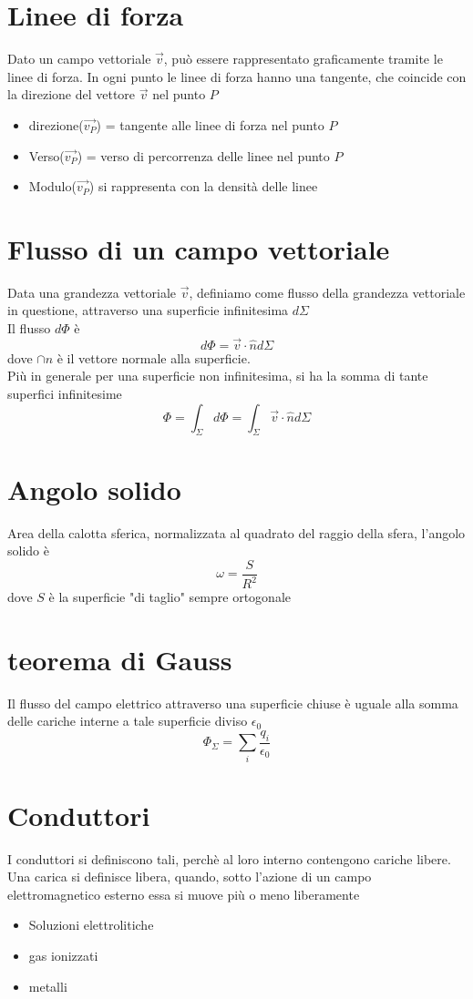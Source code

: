 \documentclass[a4paper]{report}
\begin{document}
  \section{Linee di forza}
  Dato un campo vettoriale $\vec{v}$, può essere rappresentato graficamente tramite le linee di forza. In ogni punto le linee di forza hanno una tangente, che coincide con la direzione del vettore $\vec{v}$ nel punto $P$
  \begin{itemize}
    \item direzione($\vec{v_P}$) = tangente alle linee di forza nel punto $P$
    \item Verso($\vec{v_P}$) = verso di percorrenza delle linee nel punto $P$
    \item Modulo($\vec{v_P}$) si rappresenta con la densità delle linee
  \end{itemize}

  \section{Flusso di un campo vettoriale}
  Data una grandezza vettoriale $\vec{v}$,  definiamo come flusso della grandezza vettoriale in questione, attraverso una superficie infinitesima $d \Sigma$\\
  Il flusso $d \Phi$ è
  \[ d \Phi = \vec{v}\cdot \hat{n} d \Sigma \]
  dove $\cap{n}$ è il vettore normale alla superficie.\\
  Più in generale per una superficie non infinitesima, si ha la somma di tante superfici infinitesime
  \[ \Phi = \int_\Sigma d\Phi = \int_\Sigma \vec{v} \cdot \hat{n} d\Sigma \]

  \section{Angolo solido}
  Area della calotta sferica, normalizzata al quadrato del raggio della sfera, l'angolo solido è
  \[ \omega = \frac{S}{R^2} \]
  dove $S$ è la superficie "di taglio" sempre ortogonale

  \section{teorema di Gauss}
  Il flusso del campo elettrico attraverso una superficie chiuse è uguale alla somma delle cariche interne a tale superficie diviso $\epsilon_0$
  \[ \Phi_{\Sigma} = \sum_i \frac{q_i}{\epsilon_0} \]

  \section{Conduttori}
  I conduttori si definiscono tali, perchè al loro interno contengono cariche libere. Una carica si definisce libera, quando, sotto l'azione di un campo elettromagnetico esterno essa si muove più o meno liberamente
  \begin{itemize}
    \item Soluzioni elettrolitiche
      \item gas ionizzati
    \item metalli
  \end{itemize}
\end{document}

